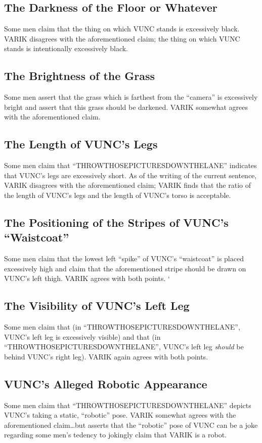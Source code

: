 \documentclass{report}
\begin{document}
\subsection{The Darkness of the Floor or Whatever}
Some men claim that the thing on which VUNC stands is excessively black.  VARIK disagrees with the aforementioned claim; the thing on which VUNC stands is intentionally excessively black.

\subsection{The Brightness of the Grass}
Some men assert that the grass which is farthest from the ``camera'' is excessively bright and assert that this grass should be darkened.  VARIK somewhat agrees with the aforementioned claim.

\subsection{The Length of VUNC's Legs}
Some men claim that ``THROWTHOSEPICTURESDOWNTHELANE'' indicates that VUNC's legs are excessively short.  As of the writing of the current sentence, VARIK disagrees with the aforementioned claim; VARIK finds that the ratio of the length of VUNC's legs and the length of VUNC's torso is acceptable.

\subsection{The Positioning of the Stripes of VUNC's ``Waistcoat''}
Some men claim that the lowest left ``spike'' of VUNC's ``waistcoat'' is placed excessively high and claim that the aforementioned stripe should be drawn on VUNC's left thigh.  VARIK agrees with both points.
`
\subsection{The Visibility of VUNC's Left Leg}
Some men claim that (in ``THROWTHOSEPICTURESDOWNTHELANE'', VUNC's left leg is excessively visible) and that (in ``THROWTHOSEPICTURESDOWNTHELANE'', VUNC's left leg \textit{should} be behind VUNC's right leg).  VARIK again agrees with both points.

\subsection{VUNC's Alleged Robotic Appearance}
Some men claim that ``THROWTHOSEPICTURESDOWNTHELANE'' depicts VUNC's taking a static, ``robotic'' pose.  VARIK somewhat agrees with the aforementioned claim\ldots but asserts that the ``robotic'' pose of VUNC can be a joke regarding some men's tedency to jokingly claim that VARIK is a robot.
\end{document}
